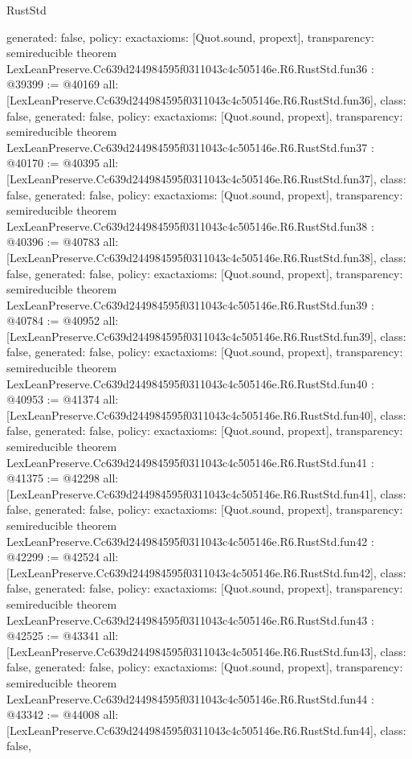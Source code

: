 \begin{lexlean}{RustStd}
\begin{coremodule}
{  generated: false,
  policy: exact{axioms: [Quot.sound, propext]},
  transparency: semireducible
}
theorem LexLeanPreserve.Cc639d244984595f0311043c4c505146e.R6.RustStd.fun36 : @39399 := @40169 {
  all: [LexLeanPreserve.Cc639d244984595f0311043c4c505146e.R6.RustStd.fun36],
  class: false,
  generated: false,
  policy: exact{axioms: [Quot.sound, propext]},
  transparency: semireducible
}
theorem LexLeanPreserve.Cc639d244984595f0311043c4c505146e.R6.RustStd.fun37 : @40170 := @40395 {
  all: [LexLeanPreserve.Cc639d244984595f0311043c4c505146e.R6.RustStd.fun37],
  class: false,
  generated: false,
  policy: exact{axioms: [Quot.sound, propext]},
  transparency: semireducible
}
theorem LexLeanPreserve.Cc639d244984595f0311043c4c505146e.R6.RustStd.fun38 : @40396 := @40783 {
  all: [LexLeanPreserve.Cc639d244984595f0311043c4c505146e.R6.RustStd.fun38],
  class: false,
  generated: false,
  policy: exact{axioms: [Quot.sound, propext]},
  transparency: semireducible
}
theorem LexLeanPreserve.Cc639d244984595f0311043c4c505146e.R6.RustStd.fun39 : @40784 := @40952 {
  all: [LexLeanPreserve.Cc639d244984595f0311043c4c505146e.R6.RustStd.fun39],
  class: false,
  generated: false,
  policy: exact{axioms: [Quot.sound, propext]},
  transparency: semireducible
}
theorem LexLeanPreserve.Cc639d244984595f0311043c4c505146e.R6.RustStd.fun40 : @40953 := @41374 {
  all: [LexLeanPreserve.Cc639d244984595f0311043c4c505146e.R6.RustStd.fun40],
  class: false,
  generated: false,
  policy: exact{axioms: [Quot.sound, propext]},
  transparency: semireducible
}
theorem LexLeanPreserve.Cc639d244984595f0311043c4c505146e.R6.RustStd.fun41 : @41375 := @42298 {
  all: [LexLeanPreserve.Cc639d244984595f0311043c4c505146e.R6.RustStd.fun41],
  class: false,
  generated: false,
  policy: exact{axioms: [Quot.sound, propext]},
  transparency: semireducible
}
theorem LexLeanPreserve.Cc639d244984595f0311043c4c505146e.R6.RustStd.fun42 : @42299 := @42524 {
  all: [LexLeanPreserve.Cc639d244984595f0311043c4c505146e.R6.RustStd.fun42],
  class: false,
  generated: false,
  policy: exact{axioms: [Quot.sound, propext]},
  transparency: semireducible
}
theorem LexLeanPreserve.Cc639d244984595f0311043c4c505146e.R6.RustStd.fun43 : @42525 := @43341 {
  all: [LexLeanPreserve.Cc639d244984595f0311043c4c505146e.R6.RustStd.fun43],
  class: false,
  generated: false,
  policy: exact{axioms: [Quot.sound, propext]},
  transparency: semireducible
}
theorem LexLeanPreserve.Cc639d244984595f0311043c4c505146e.R6.RustStd.fun44 : @43342 := @44008 {
  all: [LexLeanPreserve.Cc639d244984595f0311043c4c505146e.R6.RustStd.fun44],
  class: false,
}
\end{coremodule}
\end{lexlean}
